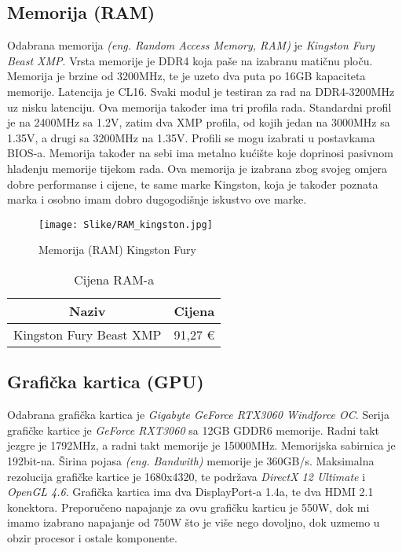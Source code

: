 \documentclass[14pt]{article}
\begin{document}
    \clearpage
    \subsection{Memorija (RAM)}
    Odabrana memorija \emph{(eng. Random Access Memory, RAM)} je \textit{Kingston Fury Beast XMP}. Vrsta memorije je DDR4 koja paše na izabranu matičnu ploču. Memorija je brzine od 3200MHz, te je uzeto dva puta po 16GB kapaciteta memorije. Latencija je CL16. Svaki modul je testiran za rad na DDR4-3200MHz uz nisku latenciju. Ova memorija također ima tri profila rada. Standardni profil je na 2400MHz sa 1.2V, zatim dva XMP profila, od kojih jedan na 3000MHz sa 1.35V, a drugi sa 3200MHz na 1.35V. Profili se mogu izabrati u postavkama BIOS-a. Memorija također na sebi ima metalno kućište koje doprinosi pasivnom hlađenju memorije tijekom rada. Ova memorija je izabrana zbog svojeg omjera dobre performanse i cijene, te same marke Kingston, koja je također poznata marka i osobno imam dobro dugogodišnje iskustvo ove marke.

    \begin{figure}[H]
        \centering
        \texttt{[image: Slike/RAM\_kingston.jpg]}
        \caption{Memorija (RAM) Kingston Fury}
        \label{fig:Memorija}
    \end{figure}

    \begin{table}[H]
        \centering
        \begin{tabular}{|c|c|}
            \hline
            Naziv & Cijena \\
            \hline
            Kingston Fury Beast XMP & 91,27 € \\
            \hline
        \end{tabular}
        \caption{Cijena RAM-a}
        \label{tab:Memorija}
    \end{table}

    \clearpage
    \subsection{Grafička kartica (GPU)}
    Odabrana grafička kartica je \textit{Gigabyte GeForce RTX3060 Windforce OC}. Serija grafičke kartice je \textit{GeForce RXT3060} sa 12GB GDDR6 memorije. Radni takt jezgre je 1792MHz, a radni takt memorije je 15000MHz. Memorijska sabirnica je 192bit-na. Širina pojasa \emph{(eng. Bandwith)} memorije je 360GB/s. Maksimalna rezolucija grafičke kartice je 1680x4320, te podržava \textit{DirectX 12 Ultimate} i \textit{OpenGL 4.6}. Grafička kartica ima dva DisplayPort-a 1.4a, te dva HDMI 2.1 konektora. Preporučeno napajanje za ovu grafičku karticu je 550W, dok mi imamo izabrano napajanje od 750W što je više nego dovoljno, dok uzmemo u obzir procesor i ostale komponente.
\end{document}
